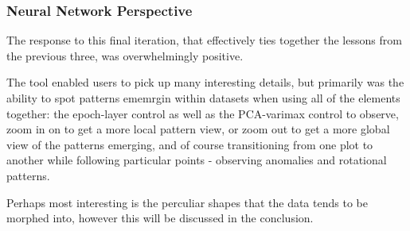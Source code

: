 \documentclass[a4paper,11pt,titlepage]{article}
\begin{document}
	\subsubsection{Neural Network Perspective}
	The response to this final iteration, that effectively ties together the lessons from the previous three, was overwhelmingly positive.
	\par 
	The tool enabled users to pick up many interesting details, but primarily was the ability to spot patterns ememrgin within datasets when using all of the elements together: the epoch-layer control as well as the PCA-varimax control to observe, zoom in on to get a more local pattern view, or zoom out to get a more global view of the patterns emerging, and of course transitioning from one plot to another while following particular points - observing anomalies and rotational patterns.
	\par 
	Perhaps most interesting is the perculiar shapes that the data tends to be morphed into, however this will be discussed in the conclusion.
	
\end{document}
